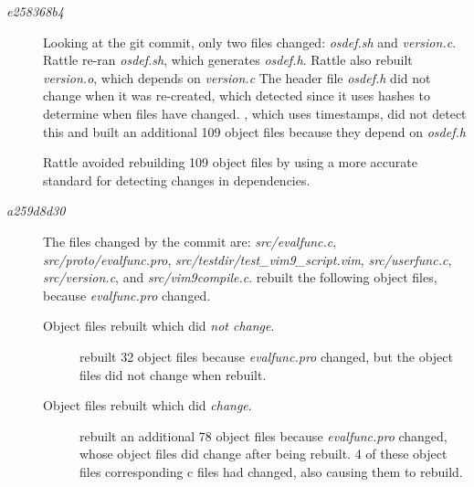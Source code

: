 \begin{description}
\item[\emph{e258368b4}]
  Looking at the git commit, only two files changed: \emph{osdef.sh} and \emph{version.c}.  Rattle re-ran \emph{osdef.sh}, which generates \emph{osdef.h}.  Rattle also rebuilt \emph{version.o}, which depends on \emph{version.c}
  The header file \emph{osdef.h} did not change when it was re-created, which \Rattle detected since it uses hashes to determine when files have changed.  \Make, which uses timestamps, did not detect this and built an additional 109 object files because they depend on \emph{osdef.h}

  Rattle avoided rebuilding 109 object files by using a more accurate standard for detecting changes in dependencies.

\item[\emph{a259d8d30}]
  The files changed by the commit are: \emph{src/evalfunc.c}, \emph{src/proto/evalfunc.pro},
  \emph{src/testdir/test\_vim9\_script.vim}, \emph{src/userfunc.c}, \emph{src/version.c}, and
  \emph{src/vim9compile.c}.
  \Rattle rebuilt the following object files, because \emph{evalfunc.pro} changed.
  \begin{description}
  \item[Object files rebuilt which did \emph{not change}.] \Rattle rebuilt 32 object files because \emph{evalfunc.pro} changed, but the object files did not change when rebuilt.
  \item[Object files rebuilt which did \emph{change}.] \Rattle rebuilt an additional 78 object files because \emph{evalfunc.pro} changed, whose object files did change after being rebuilt.
    4 of these object files corresponding c files had changed, also causing them to rebuild.

    \end{description}
\end{description}

